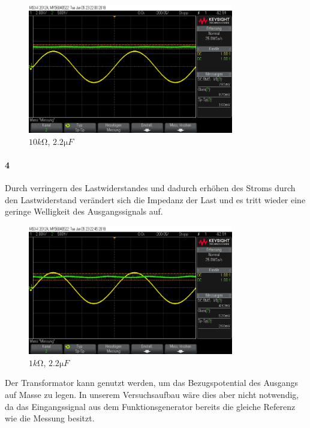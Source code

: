 \documentclass[a4paper]{article}
\begin{document}
\begin{figure}[H]
    \centering
    \includegraphics[width=0.8\textwidth]{versuch4/versuch4_3.png}
    \caption{$10\si{k\ohm}$, $2.2\si{\micro F}$}
    \label{fig:versuch4-3}
\end{figure}

\paragraph{4}

Durch verringern des Lastwiderstandes und dadurch erhöhen des Stroms durch den Lastwiderstand verändert sich die Impedanz der Last und es tritt wieder eine geringe Welligkeit des Ausgangssignals auf.

\begin{figure}[H]
    \centering
    \includegraphics[width=0.8\textwidth]{versuch4/versuch4_4.png}
    \caption{$1\si{k\ohm}$, $2.2\si{\micro F}$}
    \label{fig:versuch4-4}
\end{figure}

Der Transformator kann genutzt werden, um das Bezugspotential des Ausgangs auf Masse zu legen. In unserem Versuchsaufbau wäre dies aber nicht notwendig, da das Eingangssignal aus dem Funktionsgenerator bereits die gleiche Referenz wie die Messung besitzt.
\end{document}
